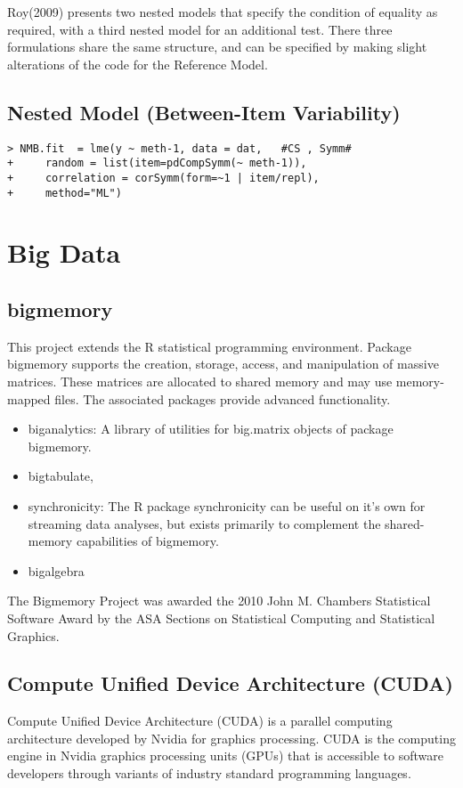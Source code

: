 \documentclass[12pt]{article} %
\begin{document}
Roy(2009) presents two nested models that specify the condition of equality as required, with a third nested model for an additional test. There three formulations share the same structure, and can be specified by making slight alterations of the code for the Reference Model.

\subsection{Nested Model (Between-Item Variability)}
\begin{framed}
\begin{verbatim}
> NMB.fit  = lme(y ~ meth-1, data = dat,   #CS , Symm#
+     random = list(item=pdCompSymm(~ meth-1)),
+     correlation = corSymm(form=~1 | item/repl), 
+     method="ML")
\end{verbatim}
\end{framed}

\newpage
\section{Big Data}

\subsection{bigmemory}
This project extends the R statistical programming environment.  Package bigmemory supports the creation, storage, access, and manipulation of massive matrices.  These matrices are allocated to shared memory and may use memory-mapped files.  The associated packages provide advanced functionality.
\begin{itemize}
\item	biganalytics: A library of utilities for big.matrix objects of package bigmemory.
\item	bigtabulate, 
\item	synchronicity: The R package synchronicity can be useful on it's own for streaming data analyses, but exists primarily to complement the shared-memory capabilities of bigmemory.
\item	bigalgebra 
\end{itemize}
The Bigmemory Project was awarded the 2010 John M. Chambers Statistical Software Award by the ASA Sections on Statistical Computing and Statistical Graphics. 

\subsection{Compute Unified Device Architecture (CUDA)}
Compute Unified Device Architecture (CUDA) is a parallel computing architecture developed by Nvidia for graphics processing.
CUDA is the computing engine in Nvidia graphics processing units (GPUs) that is accessible to software developers through variants of industry standard programming languages.
\end{document}
